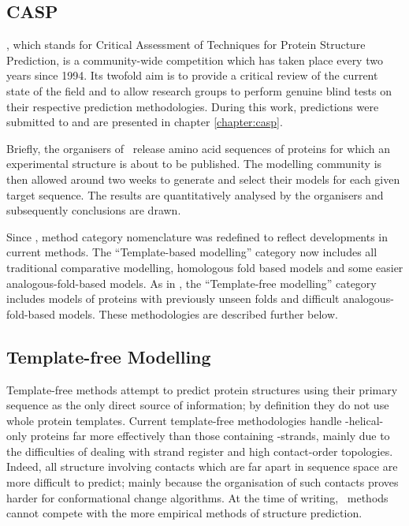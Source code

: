 \subsection{CASP}
\label{section:prot_model:casp}

\casp, which stands for Critical Assessment of Techniques for Protein Structure Prediction, is a community-wide competition which has taken place every two years since 1994\cite{METHOD:CASP6}.
Its twofold aim is to provide a critical review of the current state of the
field and to allow research groups to perform genuine blind
tests on their respective prediction methodologies. During this work, predictions were submitted to  and are presented in chapter \ref{chapter:casp}.

Briefly, the organisers of \casp\ release amino acid sequences  of proteins for which an experimental
structure is about to be published. The modelling community is then allowed
around two weeks to generate and select their models for each given
target sequence. The results are quantitatively analysed by the organisers and subsequently
conclusions are drawn.

Since , method category nomenclature was redefined to reflect developments in current methods. The ``Template-based modelling'' category now includes all traditional comparative modelling, homologous fold based models and some easier analogous-fold-based models. As in , the ``Template-free modelling'' category  includes models of proteins with previously unseen folds and difficult analogous-fold-based models.
These methodologies are described further below.



\subsection{Template-free Modelling}

Template-free methods attempt to predict protein structures using their primary
sequence as the only direct source of information; by definition they do not use whole protein templates\cite{METHOD:CASP6:NEWFOLD}.
Current template-free methodologies handle \al-helical-only proteins far more effectively than those containing \be-strands, mainly due to the difficulties
of dealing with strand register and high contact-order topologies\cite{NATIVE:Lackner1999}. Indeed, all structure involving contacts which are far apart in sequence
space are more difficult
to predict; mainly because the organisation of such contacts proves harder for conformational change
algorithms. At the time of writing, \abinitio\ methods cannot compete with the more empirical methods of structure prediction.

